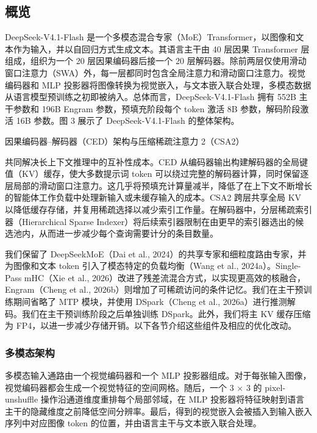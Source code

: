 \documentclass[
  10
]{article}
\begin{document}
\subsection{概览}\label{overview}

DeepSeek-V4.1-Flash 是一个多模态混合专家（MoE）Transformer，以图像和文本作为输入，并以自回归方式生成文本。其语言主干由 40 层因果 Transformer 层组成，组织为一个 20 层因果编码器后接一个 20 层解码器。除前两层仅使用滑动窗口注意力（SWA）外，每一层都同时包含全局注意力和滑动窗口注意力。视觉编码器和 MLP 投影器将图像转换为视觉嵌入，与文本嵌入联合处理，多模态数据从语言模型预训练之初即被纳入。总体而言，DeepSeek-V4.1-Flash 拥有 552B 主干参数和 196B Engram 参数，预填充阶段每个 token 激活 8B 参数，解码阶段激活 16B 参数。图 3 展示了 DeepSeek-V4.1-Flash 的整体架构。

因果编码器--解码器（CED）架构与压缩稀疏注意力 2（CSA2）



共同解决长上下文推理中的互补性成本。CED 从编码器输出构建解码器的全局键值（KV）缓存，使大多数提示词 token 可以绕过完整的解码器计算，同时保留逐层局部的滑动窗口注意力。这几乎将预填充计算量减半，降低了在上下文不断增长的智能体工作负载中处理新输入或未缓存输入的成本。CSA2 跨层共享全局 KV 以降低缓存存储，并复用稀疏选择以减少索引工作量。在解码器中，分层稀疏索引器（Hierarchical Sparse Indexer）将后续索引器限制在由更早的索引器选出的候选池内，从而进一步减少每个查询需要计分的条目数量。

我们保留了 DeepSeekMoE（Dai et al., 2024）的共享专家和细粒度路由专家，并为图像和文本 token 引入了模态特定的负载均衡（Wang et al., 2024a）。Single-Pass mHC（Xie et al., 2026）改进了残差流混合方式，以实现更高效的核融合，Engram（Cheng et al., 2026b）则增加了可稀疏访问的条件记忆。我们在主干预训练期间省略了 MTP 模块，并使用 DSpark（Cheng et al., 2026a）进行推测解码。我们在主干预训练阶段之后单独训练 DSpark。此外，我们将主 KV 缓存压缩为 FP4，以进一步减少存储开销。以下各节介绍这些组件及相应的优化改动。

\subsubsection{多模态架构}\label{multimodal-architecture}

多模态输入通路由一个视觉编码器和一个 MLP 投影器组成。对于每张输入图像，视觉编码器都会生成一个视觉特征的空间网格。随后，一个 3 $\times$ 3 的 pixel-unshuffle 操作沿通道维度重排每个局部邻域，在 MLP 投影器将特征映射到语言主干的隐藏维度之前降低空间分辨率。最后，得到的视觉嵌入会被插入到输入嵌入序列中对应图像 token 的位置，并由语言主干与文本嵌入联合处理。
\end{document}
